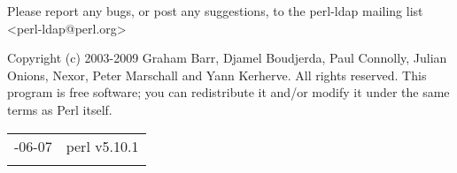 \documentclass[]{article}
\begin{document}
Please report any bugs, or post any suggestions, to the perl-ldap
mailing list \textless{}perl-ldap@perl.org\textgreater{}


Copyright (c) 2003-2009 Graham Barr, Djamel Boudjerda, Paul Connolly,
Julian Onions, Nexor, Peter Marschall and Yann Kerherve. All rights
reserved. This program is free software; you can redistribute it and/or
modify it under the same terms as Perl itself.

\begin{longtable}[c]{@{}ll@{}}
\toprule\addlinespace
2010-06-07 & perl v5.10.1
\\\addlinespace
\bottomrule
\end{longtable}
\end{document}
